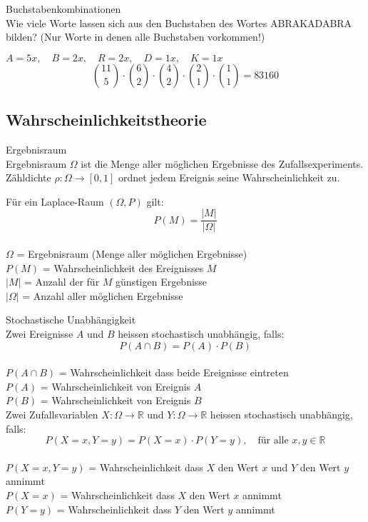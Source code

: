 \begin{example}{Buchstabenkombinationen}\\
Wie viele Worte lassen sich aus den Buchstaben des Wortes ABRAKADABRA bilden? (Nur Worte in denen alle Buchstaben vorkommen!)

$A = 5x, \quad B = 2x, \quad R = 2x, \quad D = 1x, \quad K = 1x$
$$\binom{11}{5} \cdot \binom{6}{2} \cdot \binom{4}{2} \cdot \binom{2}{1} \cdot \binom{1}{1} = 83160$$
\end{example}

\subsection{Wahrscheinlichkeitstheorie}
\begin{definition}{Ergebnisraum}\\
Ergebnisraum $\Omega$ ist die Menge aller möglichen Ergebnisse des Zufallsexperiments. Zähldichte $\rho: \Omega \rightarrow[0,1]$ ordnet jedem Ereignis seine Wahrscheinlichkeit zu.

Für ein Laplace-Raum $(\Omega, P)$ gilt:
$$
P(M)=\frac{|M|}{|\Omega|}
$$
\\
$\Omega$ = Ergebnisraum (Menge aller möglichen Ergebnisse)\\
$P(M)$ = Wahrscheinlichkeit des Ereignisses $M$\\
$|M|$ = Anzahl der für $M$ günstigen Ergebnisse\\
$|\Omega|$ = Anzahl aller möglichen Ergebnisse\\
\end{definition}

\begin{theorem}{Stochastische Unabhängigkeit}\\
Zwei Ereignisse $A$ und $B$ heissen stochastisch unabhängig, falls:
$$
P(A \cap B)=P(A) \cdot P(B)
$$
\\
$P(A \cap B)$ = Wahrscheinlichkeit dass beide Ereignisse eintreten\\
$P(A)$ = Wahrscheinlichkeit von Ereignis $A$\\
$P(B)$ = Wahrscheinlichkeit von Ereignis $B$\\

Zwei Zufallsvariablen $X: \Omega \rightarrow \mathbb{R}$ und $Y: \Omega \rightarrow \mathbb{R}$ heissen stochastisch unabhängig, falls:
$$
P(X=x, Y=y)=P(X=x) \cdot P(Y=y), \quad \text{für alle } x, y \in \mathbb{R}
$$
\\
$P(X=x, Y=y)$ = Wahrscheinlichkeit dass $X$ den Wert $x$ und $Y$ den Wert $y$ annimmt\\
$P(X=x)$ = Wahrscheinlichkeit dass $X$ den Wert $x$ annimmt\\
$P(Y=y)$ = Wahrscheinlichkeit dass $Y$ den Wert $y$ annimmt\\
\end{theorem}


